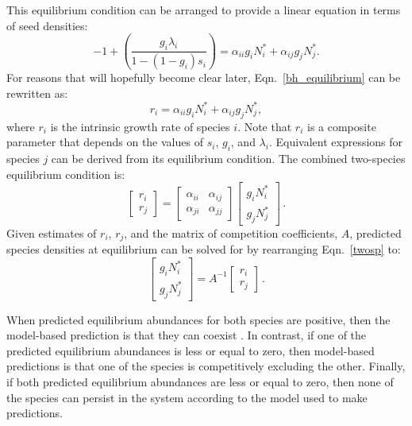 \begin{refsection}
This equilibrium condition can be arranged to provide a linear equation in terms of seed densities:
\begin{equation}
\label{bh_equilibrium}
    -1 + \left( \frac{g_{i}\lambda_{i}}{1-(1-g_{i})s_{i}} \right) = \alpha_{ii}g_{i}N_{i}^{*} + \alpha_{ij}g_{j}N_{j}^{*}.
\end{equation}
For reasons that will hopefully become clear later, Eqn.~\ref{bh_equilibrium} can be rewritten as:
\begin{equation}
  \label{growth_competition}
  r_{i} = \alpha_{ii}g_{i}N_{i}^{*} + \alpha_{ij}g_{j}N_{j}^{*},
\end{equation}
where $r_{i}$ is the intrinsic growth rate of  species $i$. Note that $r_{i}$ is a composite parameter that depends on the values of $s_{i}$, $g_{i}$, and $\lambda_{i}$. Equivalent expressions for species $j$ can be derived from its equilibrium condition. The combined two-species equilibrium condition is:
\begin{equation}
\begin{bmatrix}
r_{i} \\
r_{j}
\end{bmatrix} =
\begin{bmatrix}
\alpha_{ii} &  \alpha_{ij} \\
\alpha_{ji} & \alpha_{jj}
\end{bmatrix}
\begin{bmatrix}
g_{i}N_{i}^{*}\\ g_{j}N_{j}^{*}
\end{bmatrix} \,.
\label{twosp}
\end{equation}
Given estimates of $r_{i}$, $r_{j}$, and the matrix of competition coefficients, $A$, predicted species densities at equilibrium can be solved for by rearranging Eqn.~\ref{twosp} to:
\begin{equation}
\begin{bmatrix}
g_{i}N_{i}^{*}\\
g_{j}N_{j}^{*}
\end{bmatrix} =
A^{-1}
\begin{bmatrix}
r_{i}\\ r_{j}
\end{bmatrix} \,.
\label{abundances}
\end{equation}

When predicted equilibrium abundances for both species are positive, then the model-based prediction is that they can coexist \citep{rohr_structural_2014,saavedra2017structural}. In contrast, if one of the predicted equilibrium abundances is less or equal to zero, then model-based predictions is that one of the species is competitively excluding the other. Finally, if both predicted equilibrium abundances are less or equal to zero, then none of the species can persist in the system according to the model used to make predictions.



\end{refsection}
